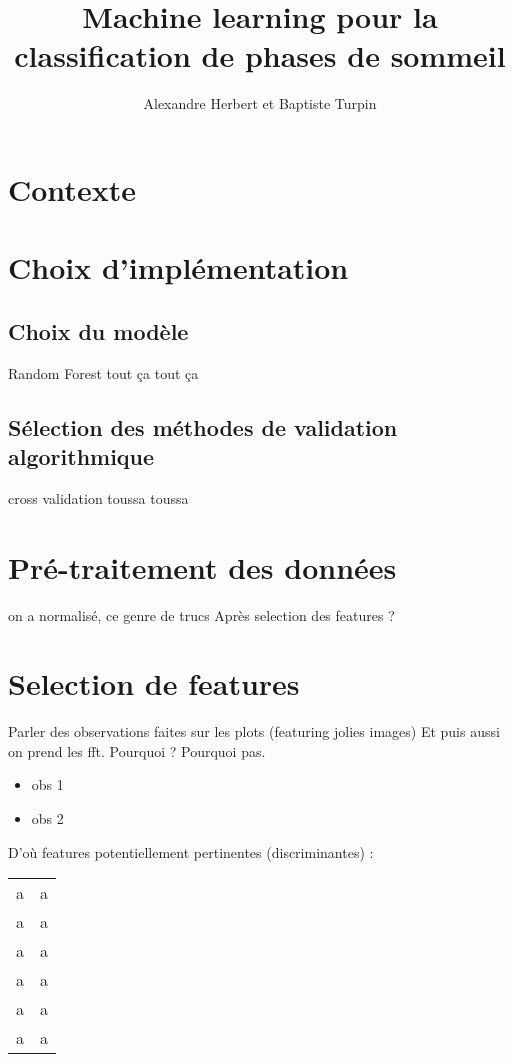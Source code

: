 \documentclass{article}
\title{Machine learning pour la classification de phases de sommeil}
\author{Alexandre Herbert et Baptiste Turpin}
\date{}
\begin{document}
\maketitle

\newpage

\setcounter{tocdepth}{2}
\renewcommand{\contentsname}{Sommaire}
\tableofcontents


\section{Contexte}

\section{Choix d'implémentation}
\subsection{Choix du modèle}
Random Forest tout ça tout ça
\subsection{Sélection des méthodes de validation algorithmique}
cross validation toussa toussa


\section{Pré-traitement des données}
on a normalisé, ce genre de trucs
Après selection des features ?

\section{Selection de features}
Parler des observations faites sur les plots (featuring jolies images) 
Et puis aussi on prend les fft. Pourquoi ? Pourquoi pas.
\begin{itemize}
\item obs 1 
\item obs 2
\end{itemize}

D'où features potentiellement pertinentes (discriminantes) :
 \begin{center}
 \begin{tabular}{|c|c|}
			 \hline
			 a & a \\
			
			 a & a  \\
			 \hline
			 a & a \\
			
			 a & a  \\
			 \hline
			 a & a \\
			
			 a & a  \\
			 \hline
 \end{tabular}
 \end{center}
\end{document}
